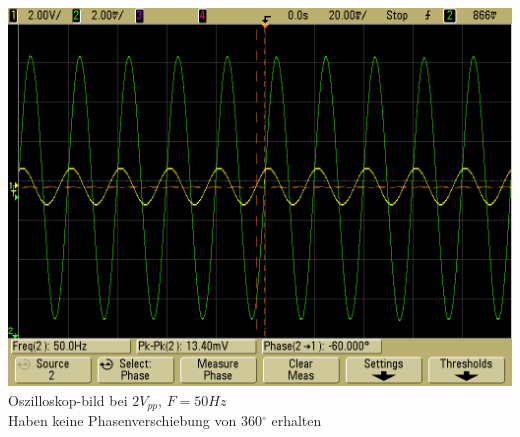 \documentclass[compress,11pt]{beamer}
\begin{document}
\begin{frame}
\includegraphics[width=.7\textwidth]{oszi/scope_66}\\
Oszilloskop-bild bei $2 V_{pp}$, $F = 50 Hz$\\
Haben keine Phasenverschiebung von 360$^\circ$ erhalten
\end{frame}
\end{document}
